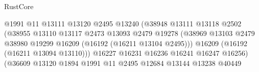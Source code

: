 \begin{lexlean}{RustCore}
\begin{coremodule}
                                                    @1991
                                                    @11
                                                    @13111
                                                    @13120
                                                    @2495
                                                    @13240
                                                    (@38948
                                                      @13111
                                                      @13118
                                                      @2502
                                                      (@38955
                                                        @13110
                                                        @13117
                                                        @2473
                                                        @13093
                                                        @2479
                                                        @19278
                                                        (@38969
                                                          @13103
                                                          @2479
                                                          @38980
                                                          @19299
                                                          @16209
                                                          (@16192 (@16211 @13104 @2495)))
                                                        @16209
                                                        (@16192 (@16211 @13094 @13110)))
                                                      @16227
                                                      @16231
                                                      @16236
                                                      @16241
                                                      @16247
                                                      @16256)
                                                    (@36609
                                                      @13120
                                                      @1894
                                                      @1991
                                                      @11
                                                      @2495
                                                      @12684
                                                      @13144
                                                      @13238
                                                      @40449

\end{coremodule}
\end{lexlean}
